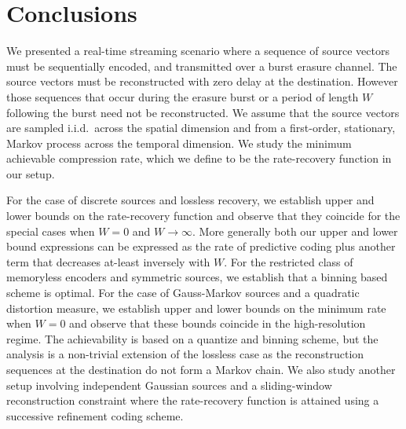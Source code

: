 \documentclass[journal, twocolumn, 10pt]{IEEEtran}
\begin{document}
{%


\section{Conclusions}
\label{sec:Conclusion}

We presented a real-time streaming scenario where a sequence of source vectors must be sequentially encoded, and transmitted over a burst erasure channel.  The source vectors must be reconstructed with zero delay at the destination. However those sequences that occur during the erasure burst or a period of length $W$ following the burst need not be reconstructed. We assume that the source vectors are sampled i.i.d.\ across the spatial dimension and from a first-order, stationary, Markov process across the temporal dimension. We study the minimum achievable compression rate, which we define to be the rate-recovery function in our setup. 

For the case of discrete sources and lossless recovery, we establish upper and lower bounds on the rate-recovery function and observe that they coincide for the special cases when $W=0$ and $W\to \infty$. More generally both our upper and lower bound expressions can be expressed as the rate of  predictive coding plus another term that decreases at-least inversely with $W$. For the restricted  class of memoryless encoders and symmetric sources, we establish that a binning based scheme is optimal. For the case of Gauss-Markov sources and a quadratic distortion measure, we establish upper and lower bounds on the minimum rate when $W=0$ and observe that these bounds coincide in the high-resolution regime. The achievability is based on a quantize and binning scheme, but the analysis is a non-trivial extension of the lossless case as the reconstruction sequences at the destination do not form a Markov chain. We also study another setup involving independent Gaussian sources and a sliding-window reconstruction constraint where the rate-recovery function is attained using a successive refinement coding scheme. 

}
\end{document}
